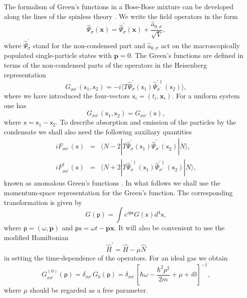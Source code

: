 \documentclass[reprint,superscriptaddress,showpacs,nofootinbib,aps,pra]{revtex4-1}
\begin{document}
The formalism of Green's functions in a Bose-Bose mixture can be developed along the lines of the spinless theory \cite{Beliaev}. We write the field operators in the form
\begin{equation}\label{Psi2}
\hat\Psi_\sigma(\bm x)=\hat\Psi_\sigma^\prime(\bm x) + \frac{\hat a_{0, \sigma}}{\sqrt{V}},
\end{equation}
where $\hat\Psi_\sigma^\prime$ stand for the non-condensed part and $\hat a_{0, \sigma}$ act on the macroscopically populated single-particle states with $\bm p=0$. The Green's functions are defined in terms of the non-condensed parts of the operators in the Heisenberg representation
\begin{equation}
\label{G}
G_{\sigma \sigma^\prime}(\mathsf x_1,\mathsf x_2) = - i \langle T \hat\Psi^\prime_\sigma(\mathsf x_1) \hat\Psi^{\prime \dag}_{\sigma^\prime}(\mathsf x_2) \rangle,
\end{equation}
where we have introduced the four-vectors $\mathsf x_i=(t_i, \bm x_i)$. For a uniform system one has
\begin{equation}
G_{\sigma \sigma^\prime}(\mathsf x_1,\mathsf x_2)=G_{\sigma \sigma^\prime}(\mathsf x),
\end{equation}
where $\mathsf x=\mathsf x_1-\mathsf x_2$. To describe absorption and emission of the particles by the condensate we shall also need the following auxiliary quantities
\begin{eqnarray}
 \label{F1}
 iF_{\sigma \sigma^\prime}(\mathsf x) &=& \langle N-2| T \hat\Psi^\prime_\sigma(\mathsf x_1) \hat\Psi^{\prime}_{\sigma^\prime}(\mathsf x_2) | N \rangle, \\ \label{F2}
 iF^\dag_{\sigma \sigma^\prime}(\mathsf x) &=& \langle N+2| T \hat\Psi^{\prime \dag}_\sigma(\mathsf x_1) \hat\Psi^{\prime \dag}_{\sigma^\prime}(\mathsf x_2) | N \rangle,
\end{eqnarray}
known as anomalous Green's functions \cite{Pitaevskii}. In what follows we shall use the momentum-space representation for the Green's function. The corresponding transformation is given by
\begin{equation}
G(\mathsf p)=\int e^{i \mathsf p \mathsf x}G(\mathsf x)d^4 \mathsf x,
\end{equation}
where $\mathsf p=(\omega, \bm p)$ and $\mathsf p\mathsf x=\omega t-\bm p\bm x$. It will also be convenient to use the modified Hamiltonian
\begin{equation}
\label{Hprime}
\hat H^\prime=\hat H-\mu \hat N
\end{equation}
in setting the time-dependence of the operators. For an ideal gas we obtain
\begin{equation}\label{G0}
  G^{(0)}_{\sigma \sigma^\prime} (\mathsf p) = \delta_{\sigma \sigma^\prime} G_{0}(\mathsf p)=\delta_{\sigma \sigma^\prime} \left[ \hbar\omega - \frac{\hbar^2p^2}{2m}+\mu+i0 \right]^{-1},
\end{equation}
where $\mu$ should be regarded as a free parameter.
\end{document}
